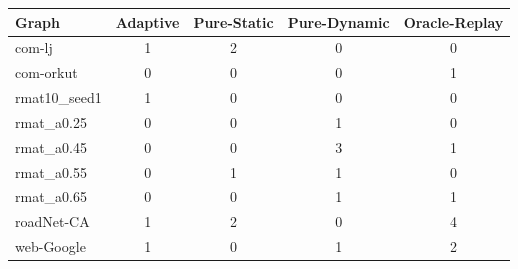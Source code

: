 \begin{tabular}{lcccc}
\hline
Graph & Adaptive & Pure-Static & Pure-Dynamic & Oracle-Replay \\
\hline
com-lj & 1 & 2 & 0 & 0 \\
com-orkut & 0 & 0 & 0 & 1 \\
rmat10_seed1 & 1 & 0 & 0 & 0 \\
rmat_a0.25 & 0 & 0 & 1 & 0 \\
rmat_a0.45 & 0 & 0 & 3 & 1 \\
rmat_a0.55 & 0 & 1 & 1 & 0 \\
rmat_a0.65 & 0 & 0 & 1 & 1 \\
roadNet-CA & 1 & 2 & 0 & 4 \\
web-Google & 1 & 0 & 1 & 2 \\
\hline
\end{tabular}
